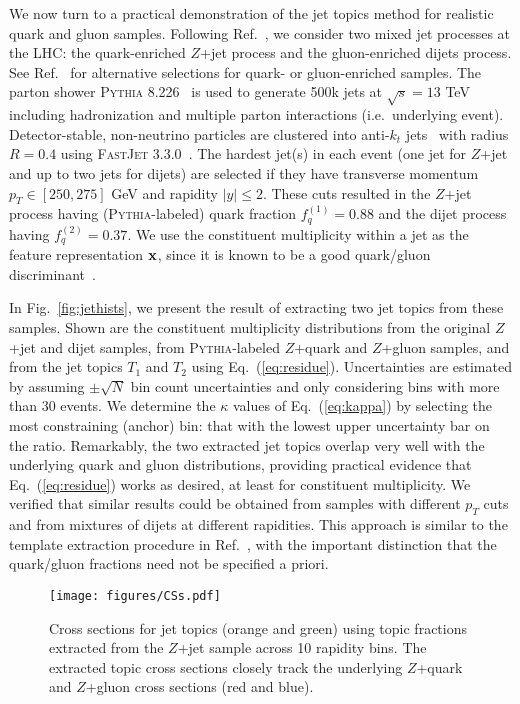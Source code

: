\documentclass[aps,prl,floatfix,preprintnumbers,twocolumn,groupedaddress,nofootinbib,longbibliography]{revtex4-1}
\DeclareRobustCommand{\Fig}[1]{Fig.~\ref{#1}}
\DeclareRobustCommand{\Eq}[1]{Eq.~(\ref{#1})}
\DeclareRobustCommand{\Ref}[1]{Ref.~\cite{#1}}
\begin{document}
We now turn to a practical demonstration of the jet topics method for realistic quark and gluon samples.
%
Following \Ref{Gras:2017jty}, we consider two mixed jet processes at the LHC:  the quark-enriched $Z$+jet process and the gluon-enriched dijets process.
%
See \Ref{Gallicchio:2011xc} for alternative selections for quark- or gluon-enriched samples.
%
The parton shower \textsc{Pythia 8.226}~\cite{Sjostrand:2006za,Sjostrand:2014zea} is used to generate 500k jets at $\sqrt{s}=13$ TeV including hadronization and multiple parton interactions (i.e.\ underlying event).
%
Detector-stable, non-neutrino particles are clustered into anti-$k_t$ jets~\cite{Cacciari:2008gp} with radius $R=0.4$ using \textsc{FastJet 3.3.0}~\cite{Cacciari:2011ma}.
%
The hardest jet(s) in each event (one jet for $Z$+jet and up to two jets for dijets) are selected if they have transverse momentum $p_T \in [250,275]$ GeV and rapidity $|y|\le2$.
%
These cuts resulted in the $Z$+jet process having (\textsc{Pythia}-labeled) quark fraction $f^{(1)}_q = 0.88$ and the dijet process having $f^{(2)}_q  = 0.37$.
%
We use the constituent multiplicity within a jet as the feature representation ${\bf x}$, since it is known to be a good quark/gluon discriminant~\cite{Gallicchio:2012ez}.

In \Fig{fig:jethists}, we present the result of extracting two jet topics from these samples.
%
Shown are the constituent multiplicity distributions from the original $Z$+jet and dijet samples, from \textsc{Pythia}-labeled $Z$+quark and $Z$+gluon samples, and from the jet topics $T_1$ and $T_2$ using \Eq{eq:residue}.
%
Uncertainties are estimated by assuming $\pm \sqrt{N}$ bin count uncertainties and only considering bins with more than 30 events.
%
We determine the $\kappa$ values of \Eq{eq:kappa} by selecting the most constraining (anchor) bin: that with the lowest upper uncertainty bar on the ratio.
%
Remarkably, the two extracted jet topics overlap very well with the underlying quark and gluon distributions, providing practical evidence that \Eq{eq:residue} works as desired, at least for constituent multiplicity.
%
We verified that similar results could be obtained from samples with different $p_T$ cuts and from mixtures of dijets at different rapidities.
%
This approach is similar to the template extraction procedure in \Ref{ATLAS:2016wzt}, with the important distinction that the quark/gluon fractions need not be specified a priori.


\begin{figure}[t]
\texttt{[image: figures/CSs.pdf]}
\caption{Cross sections for jet topics (orange and green) using topic fractions extracted from the $Z$+jet sample across 10 rapidity bins.  The extracted topic cross sections closely track the underlying $Z$+quark and $Z$+gluon cross sections (red and blue).}
\label{fig:cs}
\end{figure}
\end{document}
